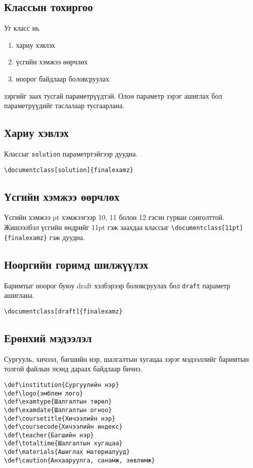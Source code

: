 \documentclass[10pt]{article}
\theoremstyle{definition}
\begin{document}
\subsection{Классын тохиргоо}

Уг класс нь
\begin{enumerate}
 \item хариу хэвлэх
 \item үсгийн хэмжээ өөрчлөх
 \item ноорог байдлаар боловсруулах
\end{enumerate}
зэргийг заах тусгай параметрүүдтэй. Олон параметр зэрэг ашиглах бол параметрүүдийг таслалаар тусгаарлана.

\subsection{Хариу хэвлэх}

Классыг \texttt{solution} параметртэйгээр дуудна.
\begin{verbatim}
\documentclass[solution]{finalexamz}
\end{verbatim}

\subsection{Үсгийн хэмжээ өөрчлөх}

Үсгийн хэмжээ pt хэмжээгээр 10, 11 болон 12 гэсэн гурван сонголттой. Жишээлбэл үсгийн өндрийг 11pt гэж заахдаа классыг \verb|\documentclass[11pt]{finalexamz}| гэж дуудна.

\subsection{Нооргийн горимд шилжүүлэх}

Баримтыг ноорог буюу draft хэлбэрээр боловсруулах бол \texttt{draft} параметр ашиглана. 
\begin{verbatim}
\documentclass[draft]{finalexamz}
\end{verbatim}

\subsection{Ерөнхий мэдээлэл}

Сургууль, хичээл, багшийн нэр, шалгалтын хугацаа зэрэг мэдээллийг баримтын толгой файлын эхэнд дараах байдлаар бичнэ.
\begin{verbatim}
\def\institution{Сургуулийн нэр}
\def\logo{эмблем лого}
\def\examtype{Шалгалтын төрөл}
\def\examdate{Шалгалтын огноо}
\def\coursetitle{Хичээлийн нэр}
\def\coursecode{Хичээлийн индекс}
\def\teacher{Багшийн нэр}
\def\totaltime{Шалгалтын хугацаа}
\def\materials{Ашиглах материалууд}
\def\caution{Анхааруулга, санамж, зөвлөмж}
\end{verbatim}
\end{document}
